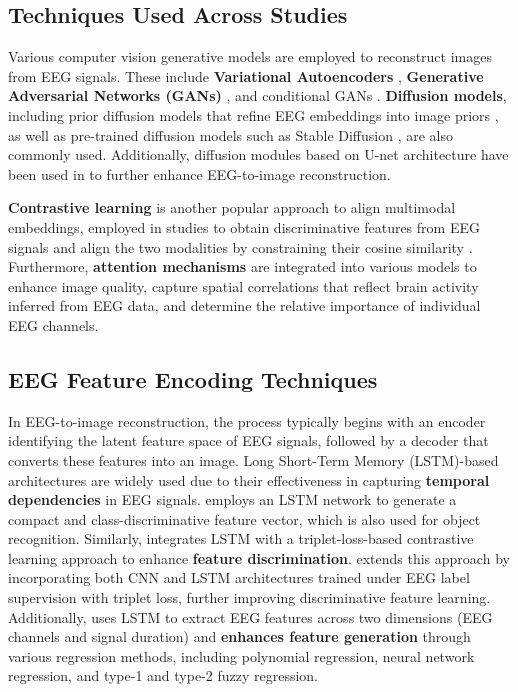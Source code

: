 \subsection{Techniques Used Across Studies}

Various computer vision generative models are employed to reconstruct    images from EEG signals. These include \textbf{Variational Autoencoders} \cite{kavasidis2017brain2image, wakita2021photorealistic}, \textbf{Generative Adversarial Networks (GANs) }\cite{kavasidis2017brain2image, khaleghi2022visual, mishra2023neurogan, singh2024learning, li2024visual}, and conditional GANs \cite{singh2023eeg2image, ahmadieh2024visual}. \textbf{Diffusion models}, including prior diffusion models that refine EEG embeddings into image priors \cite{shimizu2022improving}, as well as pre-trained diffusion models such as Stable Diffusion \cite{bai2306dreamdiffusion}, are also commonly used. Additionally, diffusion modules based on U-net architecture have been used in \cite{zeng2023dm, lan2023seeing} to further enhance EEG-to-image reconstruction.

\textbf{Contrastive learning} is another popular approach to align multimodal embeddings, employed in studies \cite{singh2023eeg2image, lan2023seeing, song2023decoding, sugimoto2024image} to obtain discriminative features from EEG signals and align the two modalities by constraining their cosine similarity \cite{song2023decoding}. Furthermore, \textbf{attention mechanisms} are integrated into various models \cite{mishra2023neurogan, song2023decoding, li2024visual} to enhance image quality, capture spatial correlations that reflect brain activity inferred from EEG data, and determine the relative importance of individual EEG channels.


\subsection{EEG Feature Encoding Techniques}

In EEG-to-image reconstruction, the process typically begins with an encoder identifying the latent feature space of EEG signals, followed by a decoder that converts these features into an image. Long Short-Term Memory (LSTM)-based architectures are widely used due to their effectiveness in capturing \textbf{temporal dependencies} in EEG signals. \citet{kavasidis2017brain2image} employs an LSTM network to generate a compact and class-discriminative feature vector, which is also used for object recognition. Similarly, \cite{singh2023eeg2image} integrates LSTM with a triplet-loss-based contrastive learning approach to enhance \textbf{feature discrimination}. \citet{singh2024learning} extends this approach by incorporating both CNN and LSTM architectures trained under EEG label supervision with triplet loss, further improving discriminative feature learning. Additionally, \cite{ahmadieh2024visual} uses LSTM to extract EEG features across two dimensions (EEG channels and signal duration) and \textbf{enhances feature generation} through various regression methods, including polynomial regression, neural network regression, and type-1 and type-2 fuzzy regression.

